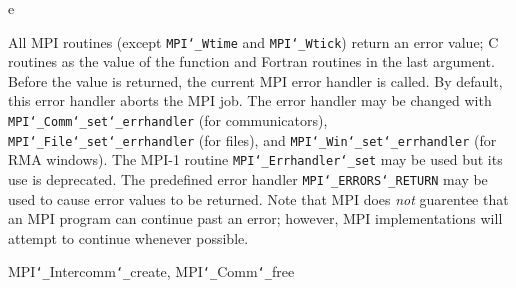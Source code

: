 e
\par
{}
\par
All MPI routines (except {\tt MPI{\tt \char`\_}Wtime} and {\tt MPI{\tt \char`\_}Wtick}) return an error value;
C routines as the value of the function and Fortran routines in the last
argument.  Before the value is returned, the current MPI error handler is
called.  By default, this error handler aborts the MPI job.  The error handler
may be changed with {\tt MPI{\tt \char`\_}Comm{\tt \char`\_}set{\tt \char`\_}errhandler} (for communicators),
{\tt MPI{\tt \char`\_}File{\tt \char`\_}set{\tt \char`\_}errhandler} (for files), and {\tt MPI{\tt \char`\_}Win{\tt \char`\_}set{\tt \char`\_}errhandler} (for
RMA windows).  The MPI-1 routine {\tt MPI{\tt \char`\_}Errhandler{\tt \char`\_}set} may be used but
its use is deprecated.  The predefined error handler
{\tt MPI{\tt \char`\_}ERRORS{\tt \char`\_}RETURN} may be used to cause error values to be returned.
Note that MPI does {\em not} guarentee that an MPI program can continue past
an error; however, MPI implementations will attempt to continue whenever
possible.
\par
{}
\par
{}
 MPI{\tt \char`\_}Intercomm{\tt \char`\_}create, MPI{\tt \char`\_}Comm{\tt \char`\_}free
\nextline
{}
\endmanpage
